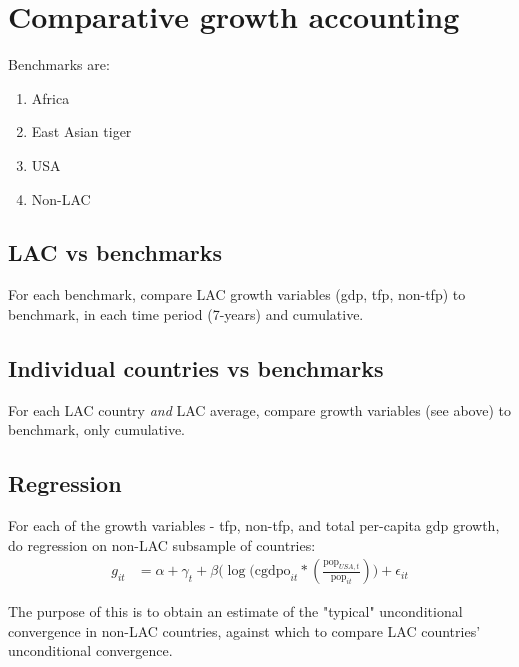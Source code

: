 \documentclass[12pt,english]{article}
\theoremstyle{remark}
\begin{document}








\section{Comparative growth accounting}

Benchmarks are:
\begin{enumerate}
	\item Africa
	\item East Asian tiger
	\item USA
	\item Non-LAC
\end{enumerate}

\subsection{LAC vs benchmarks}

For each benchmark, compare LAC growth variables (gdp, tfp, non-tfp) to benchmark, in each time period (7-years) and cumulative.

\subsection{Individual countries vs benchmarks}

For each LAC country \textit{and} LAC average, compare growth variables (see above) to benchmark, only cumulative.

\subsection{Regression}

For each of the growth variables - tfp, non-tfp, and total per-capita gdp growth, do regression on non-LAC subsample of countries:
\begin{align}
	g_{it} &= \alpha + \gamma_t + \beta \big( \log (\textrm{cgdpo}_{it} * (\frac{\textrm{pop}_{USA,t}}{\textrm{pop}_{it}} ) \big) + \epsilon_{it}
\end{align}

The purpose of this is to obtain an estimate of the "typical" unconditional convergence in non-LAC countries, against which to compare LAC countries' unconditional convergence. 
\end{document}
